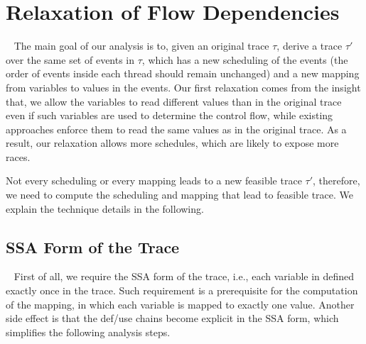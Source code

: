 \section{Relaxation of Flow Dependencies}~\label{sec:relax1}
The main goal of our analysis is to, given an original trace $\tau$, derive a trace $\tau'$ over the same set of events in $\tau$, which has a new scheduling  of the events (the order of events inside each thread should remain unchanged) and a new mapping from variables to values in the events. Our first relaxation comes from the insight that, we allow the variables to read different values than in the original trace even if such variables are used to determine the control flow, while existing approaches enforce them to read the same values as in the original trace. As a result, our relaxation allows more schedules, which are likely to expose more races.
 
Not every scheduling or every mapping  leads to a new feasible trace $\tau'$, therefore, we need to compute the scheduling and mapping that lead to feasible trace. We explain the technique details in the following.





\subsection{SSA Form of the Trace}~\label{sec:ssa}
First of all, we require the SSA form of the trace, i.e., each variable in defined exactly once in the trace. Such requirement is a prerequisite for the computation of the mapping, in which each variable is mapped to exactly one value. Another side effect is that the def/use chains become explicit in the SSA form, which simplifies the following analysis steps.

